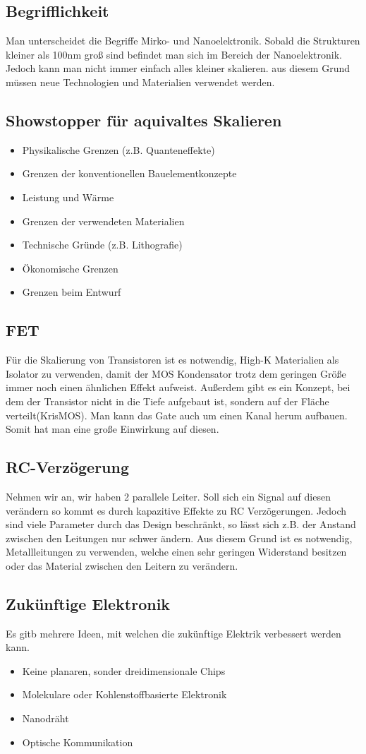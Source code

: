 \subsection{Begrifflichkeit}
	Man unterscheidet die Begriffe Mirko- und Nanoelektronik. Sobald die Strukturen kleiner als 100nm groß sind befindet man sich im Bereich der Nanoelektronik. Jedoch kann man nicht immer einfach alles kleiner skalieren. aus diesem Grund müssen neue Technologien und Materialien verwendet werden.
\subsection{Showstopper für aquivaltes Skalieren}
	\begin{itemize}
		\item Physikalische Grenzen (z.B. Quanteneffekte)
		\item Grenzen der konventionellen Bauelementkonzepte
		\item Leistung und Wärme
		\item Grenzen der verwendeten Materialien
		\item Technische Gründe (z.B. Lithografie)
		\item Ökonomische Grenzen
		\item Grenzen beim Entwurf
	\end{itemize}
\subsection{FET}
	Für die Skalierung von Transistoren ist es notwendig, High-K Materialien als Isolator zu verwenden, damit der MOS Kondensator trotz dem geringen Größe immer noch einen ähnlichen Effekt aufweist. Außerdem gibt es ein Konzept, bei dem der Transistor nicht in die Tiefe aufgebaut ist, sondern auf der Fläche verteilt(KrisMOS). Man kann das Gate auch um einen Kanal herum aufbauen. Somit hat man eine große Einwirkung auf diesen.
\subsection{RC-Verzögerung}
	Nehmen wir an, wir haben 2 parallele Leiter. Soll sich ein Signal auf diesen verändern so kommt es durch kapazitive Effekte zu RC Verzögerungen. Jedoch sind viele Parameter durch das Design beschränkt, so lässt sich z.B. der Anstand zwischen den Leitungen nur schwer ändern. Aus diesem Grund ist es notwendig, Metallleitungen zu verwenden, welche einen sehr geringen Widerstand besitzen oder das Material zwischen den Leitern zu verändern.
\subsection{Zukünftige Elektronik}
	Es gitb mehrere Ideen, mit welchen die zukünftige Elektrik verbessert werden kann.
	\begin{itemize}
		\item Keine planaren, sonder dreidimensionale Chips
		\item Molekulare oder Kohlenstoffbasierte Elektronik
		\item Nanodräht
		\item Optische Kommunikation
	\end{itemize}

